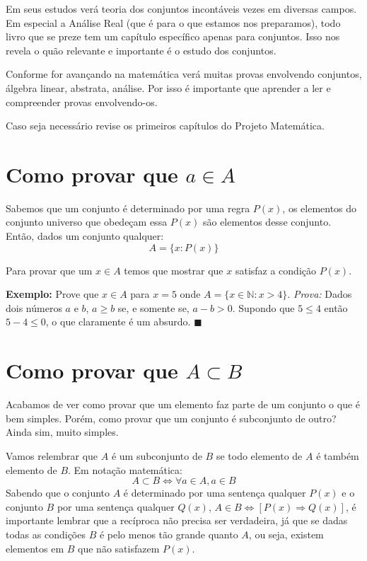 \documentclass[book_of_proof.tex]{subfiles}
\begin{document}
Em seus estudos verá teoria dos conjuntos incontáveis vezes em diversas campos. Em especial a Análise Real (que é para o que estamos nos preparamos), todo livro que se preze tem um capítulo específico apenas para conjuntos. Isso nos revela o quão relevante e importante é o estudo dos conjuntos.
\par 

Conforme for avançando na matemática verá muitas provas envolvendo conjuntos, álgebra linear, abstrata, análise. Por isso é importante que aprender a ler e compreender provas envolvendo-os.
\par 

Caso seja necessário revise os primeiros capítulos do Projeto Matemática.

\section{Como provar que $ a \in A $}
Sabemos que um conjunto é determinado por uma regra $P(x)$, os elementos do conjunto universo que obedeçam essa $P(x)$ são elementos desse conjunto. Então, dados um conjunto qualquer:
$$A = \{x: P(x)\}$$

Para provar que um $x \in A$ temos que mostrar que $x$ satisfaz a condição $P(x)$.

\textbf{Exemplo:} Prove que $x \in A$ para $x = 5$ onde $A = \lbrace x \in \mathbb{N}: x > 4\rbrace$.
\textit{Prova:} Dados dois números $a$ e $b$, $a \geq b$ se, e somente se, $a - b > 0$. Supondo que $5 \leq 4$ então $5 - 4 \leq 0$, o que claramente é um absurdo. $\blacksquare$

\section{Como provar que $A \subset B$}
Acabamos de ver como provar que um elemento faz parte de um conjunto o que é bem simples. Porém, como provar que um conjunto é subconjunto de outro? Ainda sim, muito simples.
\par

Vamos relembrar que $A$ é um subconjunto de $B$ se todo elemento de $A$ é também elemento de $B$. Em notação matemática:
$$A \subset B \Leftrightarrow \forall a \in A, a \in B$$
Sabendo que o conjunto $A$ é determinado por uma sentença qualquer $P(x)$ e o conjunto $B$ por uma sentença qualquer $Q(x)$, $A \in B \Leftrightarrow [P(x) \Rightarrow Q(x)]$, é importante lembrar que a recíproca não precisa ser verdadeira, já que se dadas todas as condições $B$ é pelo menos tão grande quanto $A$, ou seja, existem elementos em $B$ que não satisfazem $P(x)$.
\\
\end{document}
